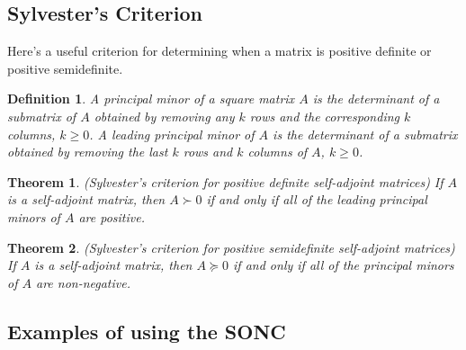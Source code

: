 \documentclass[11pt]{article}
\newtheorem{definition}{Definition}[subsection]
\newtheorem{theorem}{Theorem}[subsection]
\begin{document}
\subsection{Sylvester's Criterion}
Here's a useful criterion for determining when a matrix is positive definite or positive semidefinite.
\begin{definition}
A principal minor of a square matrix $A$ is the determinant of a submatrix of $A$ obtained by removing any $k$ rows and the corresponding $k$ columns, $k \geq 0$. A leading principal minor of $A$ is the determinant of a submatrix obtained by removing the last $k$ rows and $k$ columns of $A$, $k \geq 0$.
\end{definition}

\begin{theorem}
(Sylvester's criterion for positive definite self-adjoint matrices) If $A$ is a self-adjoint matrix, then $A \succ 0$ if and only if all of the leading principal minors of $A$ are positive.
\end{theorem}
\begin{theorem}
(Sylvester's criterion for positive semidefinite self-adjoint matrices) If $A$ is a self-adjoint matrix, then $A \succeq 0$ if and only if all of the principal minors of $A$ are non-negative.
\end{theorem}

\subsection{Examples of using the SONC}
\end{document}
